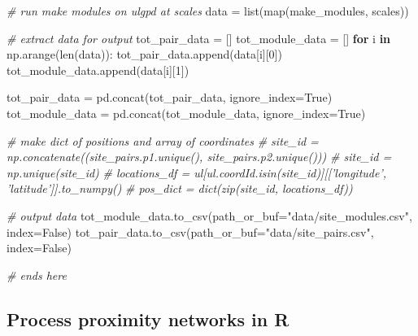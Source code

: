 \documentclass[]{article}
\newenvironment{Shaded}{}{}
\newcommand{\BuiltInTok}[1]{#1}
\newcommand{\CommentTok}[1]{\textcolor[rgb]{0.38,0.63,0.69}{\textit{#1}}}
\newcommand{\ControlFlowTok}[1]{\textcolor[rgb]{0.00,0.44,0.13}{\textbf{#1}}}
\newcommand{\DecValTok}[1]{\textcolor[rgb]{0.25,0.63,0.44}{#1}}
\newcommand{\KeywordTok}[1]{\textcolor[rgb]{0.00,0.44,0.13}{\textbf{#1}}}
\newcommand{\NormalTok}[1]{#1}
\newcommand{\OperatorTok}[1]{\textcolor[rgb]{0.40,0.40,0.40}{#1}}
\newcommand{\StringTok}[1]{\textcolor[rgb]{0.25,0.44,0.63}{#1}}
\newcommand{\VariableTok}[1]{\textcolor[rgb]{0.10,0.09,0.49}{#1}}
\begin{document}
\begin{Shaded}
\begin{Highlighting}[]
\CommentTok{# run make modules on ulgpd at scales}
\NormalTok{data }\OperatorTok{=} \BuiltInTok{list}\NormalTok{(}\BuiltInTok{map}\NormalTok{(make_modules, scales))}

\CommentTok{# extract data for output}
\NormalTok{tot_pair_data }\OperatorTok{=}\NormalTok{ []}
\NormalTok{tot_module_data }\OperatorTok{=}\NormalTok{ []}
\ControlFlowTok{for}\NormalTok{ i }\KeywordTok{in}\NormalTok{ np.arange(}\BuiltInTok{len}\NormalTok{(data)):}
\NormalTok{    tot_pair_data.append(data[i][}\DecValTok{0}\NormalTok{])}
\NormalTok{    tot_module_data.append(data[i][}\DecValTok{1}\NormalTok{])}

\NormalTok{tot_pair_data }\OperatorTok{=}\NormalTok{ pd.concat(tot_pair_data, ignore_index}\OperatorTok{=}\VariableTok{True}\NormalTok{)}
\NormalTok{tot_module_data }\OperatorTok{=}\NormalTok{ pd.concat(tot_module_data, ignore_index}\OperatorTok{=}\VariableTok{True}\NormalTok{)}

\CommentTok{# make dict of positions and array of coordinates}
\CommentTok{# site_id = np.concatenate((site_pairs.p1.unique(), site_pairs.p2.unique()))}
\CommentTok{# site_id = np.unique(site_id)}
\CommentTok{# locations_df = ul[ul.coordId.isin(site_id)][['longitude', 'latitude']].to_numpy()}
\CommentTok{# pos_dict = dict(zip(site_id, locations_df))}

\CommentTok{# output data}
\NormalTok{tot_module_data.to_csv(path_or_buf}\OperatorTok{=}\StringTok{"data/site_modules.csv"}\NormalTok{, index}\OperatorTok{=}\VariableTok{False}\NormalTok{)}
\NormalTok{tot_pair_data.to_csv(path_or_buf}\OperatorTok{=}\StringTok{"data/site_pairs.csv"}\NormalTok{, index}\OperatorTok{=}\VariableTok{False}\NormalTok{)}

\CommentTok{# ends here}
\end{Highlighting}
\end{Shaded}

\hypertarget{process-proximity-networks-in-r}{%
\subsection{Process proximity networks in R}\label{process-proximity-networks-in-r}}
\end{document}
